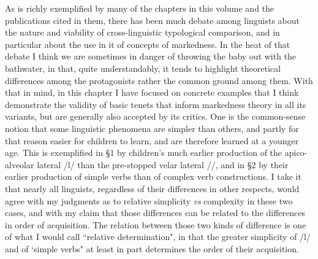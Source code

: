 \documentclass[output=paper]{langsci/langscibook}
\begin{document}
   As is richly exemplified by many of the chapters in this volume and the publications cited in them, there has been much debate among linguists about the nature and viability of cross-linguistic typological comparison, and in particular about the use in it of concepts of markedness. In the heat of that debate I think we are sometimes in danger of throwing the baby out with the bathwater, in that, quite understandably, it tends to highlight theoretical differences among the protagonists rather the common ground among them. With that in mind, in this chapter I have focused on concrete examples that I think demonstrate the validity of basic tenets that inform markedness theory in all its variants, but are generally also accepted by its critics. One is the common-sense notion that some linguistic phenomena are simpler than others, and partly for that reason easier for children to learn, and are therefore learned at a younger age. This is exemplified in §1 by  children’s much earlier production of the apico-alveolar lateral /l/ than the pre-stopped velar lateral /{\gL}/, and in §2 by their earlier production of simple verbs than of complex verb constructions. I take it that nearly all linguists, regardless of their differences in other respects, would agree with my judgments as to relative simplicity \textit{vs} complexity in these two cases, and with my claim that those differences can be related to the differences in order of acquisition. The relation between those two kinds of difference is one of what I would call ``relative determination", in that the greater simplicity of /l/ and of `simple verbs" at least in part determines the order of their acquisition.  
\end{document}
